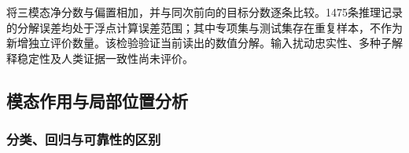 将三模态净分数与偏置相加，并与同次前向的目标分数逐条比较。1475条推理记录的分解误差均处于浮点计算误差范围；其中专项集与测试集存在重复样本，不作为新增独立评价数量。该检验验证当前读出的数值分解。输入扰动忠实性、多种子解释稳定性及人类证据一致性尚未评价。

\hypertarget{q3-ux6a21ux6001ux4f5cux7528ux4e0eux5c40ux90e8ux4f4dux7f6eux5206ux6790}{%
\subsection{模态作用与局部位置分析}\label{q3-ux6a21ux6001ux4f5cux7528ux4e0eux5c40ux90e8ux4f4dux7f6eux5206ux6790}}

\hypertarget{q3-ux5206ux7c7bux56deux5f52ux4e0eux53efux9760ux6027ux7684ux533aux522b}{%
\subsubsection{分类、回归与可靠性的区别}\label{q3-ux5206ux7c7bux56deux5f52ux4e0eux53efux9760ux6027ux7684ux533aux522b}}

